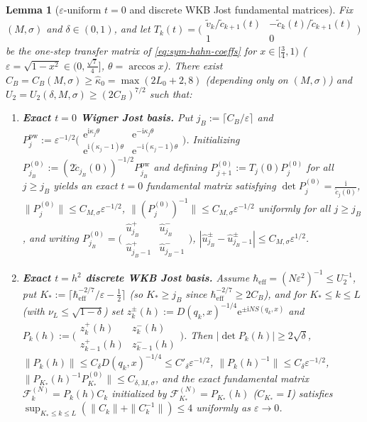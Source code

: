 \documentclass[11pt]{article}
\newtheorem{lemma}[theorem]{Lemma}
\theoremstyle{definition}
\theoremstyle{remark}
\newcommand{\ii}{\mathrm{i}}
\newcommand{\heff}{\hbar_{\mathrm{eff}}}
\renewcommand{\_}{\oldunderscore\penalty0\hskip0pt\relax}
\begin{document}
\begin{lemma}[$\varepsilon$-uniform $t=0$ and discrete WKB Jost fundamental matrices]
\label{lem:eps-wkb-jost}
Fix $(M,\sigma)$ and $\delta\in(0,1)$, and let $T_k(t)=\bigl(\begin{smallmatrix}\tilde{v}_k/\tilde{c}_{k+1}(t) &
  -\tilde{c}_k(t)/\tilde{c}_{k+1}(t)\\ 1 & 0\end{smallmatrix}\bigr)$ be the one-step transfer matrix of
  \eqref{eq:sym-hahn-coeffs} for $x\in[\frac34,1)$ ($\varepsilon=\sqrt{1-x^2}\in(0,\frac{\sqrt{7}}{4}]$, $\theta=\arccos x$).
  There exist $C_B=C_B(M,\sigma)\ge\hat{\kappa}_0=\max(2L_0+2,8)$ (depending only on $(M,\sigma)$) and
  $U_2=U_2(\delta,M,\sigma)\ge(2C_B)^{7/2}$ such that:
\begin{enumerate}[label=(\alph*),leftmargin=2em,itemsep=2pt]
\item \textbf{Exact $t=0$ Wigner Jost basis.} Put $j_B:=\lceil C_B/\varepsilon\rceil$ and
  $P_j^{\mathrm{pw}}:=\varepsilon^{-1/2}\bigl(\begin{smallmatrix}\mathrm{e}^{\ii\kappa_j\theta} &
  \mathrm{e}^{-\ii\kappa_j\theta}\\ \mathrm{e}^{\ii(\kappa_j-1)\theta} &
  \mathrm{e}^{-\ii(\kappa_j-1)\theta}\end{smallmatrix}\bigr)$. Initializing
  $P_{j_B}^{(0)}:=(2\tilde{c}_{j_B}(0))^{-1/2}P_{j_B}^{\mathrm{pw}}$ and defining $P_{j+1}^{(0)}:=T_j(0)P_j^{(0)}$ for all $j\ge
  j_B$ yields an exact $t=0$ fundamental matrix satisfying $\det P_j^{(0)}=\frac{\ii}{\tilde{c}_j(0)}$, $\|P_j^{(0)}\|\le
  C_{M,\sigma}\varepsilon^{-1/2}$, $\|(P_j^{(0)})^{-1}\|\le C_{M,\sigma}\varepsilon^{-1/2}$ uniformly for all $j\ge j_B$, and
  writing $P_{j_B}^{(0)}=\bigl(\begin{smallmatrix}\widehat{u}_{j_B}^+ & \widehat{u}_{j_B}^-\\ \widehat{u}_{j_B-1}^+ &
  \widehat{u}_{j_B-1}^-\end{smallmatrix}\bigr)$, $|\widehat{u}_{j_B}^\pm-\widehat{u}_{j_B-1}^\pm|\le
  C_{M,\sigma}\varepsilon^{1/2}$.
\item \textbf{Exact $t=h^2$ discrete WKB Jost basis.} Assume $\heff=(N\varepsilon^2)^{-1}\le U_2^{-1}$, put
  $K_*:=\lceil\heff^{-2/7}/\varepsilon-\frac12\rceil$ (so $K_*\ge j_B$ since $\heff^{-2/7}\ge 2C_B$), and for $K_*\le k\le L$
  (with $\nu_L\le\sqrt{1-\delta}$) set $z_k^\pm(h):=D(q_k,x)^{-1/4}\mathrm{e}^{\pm\ii N S(q_k,x)}$ and
  $P_k(h):=\bigl(\begin{smallmatrix}z_k^+(h) & z_k^-(h)\\ z_{k-1}^+(h) & z_{k-1}^-(h)\end{smallmatrix}\bigr)$. Then $|\det
  P_k(h)|\ge 2\sqrt{\delta}$, $\|P_k(h)\|\le C_\delta D(q_k,x)^{-1/4}\le C'_\delta\varepsilon^{-1/2}$, $\|P_k(h)^{-1}\|\le
  C_\delta\varepsilon^{-1/2}$, $\|P_{K_*}(h)^{-1}P_{K_*}^{(0)}\|\le C_{\delta,M,\sigma}$, and the exact fundamental matrix
  $\mathcal{F}_k^{(N)}=P_k(h)C_k$ initialized by $\mathcal{F}_{K_*}^{(N)}=P_{K_*}(h)$ ($C_{K_*}=I$) satisfies $\sup_{K_*\le k\le
  L}(\|C_k\|+\|C_k^{-1}\|)\le 4$ uniformly as $\varepsilon\to 0$.
\end{enumerate}
\end{lemma}
\end{document}
